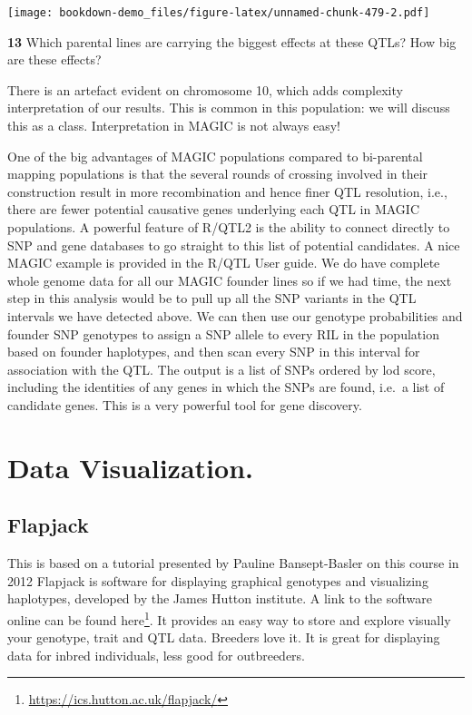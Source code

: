 \documentclass[
]{book}
\makeatletter
\renewcommand{\href}[2]{#2\footnote{\url{#1}}}
\newenvironment{kframe}{%
\medskip{}
\setlength{\fboxsep}{.8em}
 \def\at@end@of@kframe{}%
 \ifinner\ifhmode%
  \def\at@end@of@kframe{\end{minipage}}%
  \begin{minipage}{\columnwidth}%
 \fi\fi%
 \def\FrameCommand##1{\hskip\@totalleftmargin \hskip-\fboxsep
 \colorbox{shadecolor}{##1}\hskip-\fboxsep
     \hskip-\linewidth \hskip-\@totalleftmargin \hskip\columnwidth}%
 \MakeFramed {\advance\hsize-\width
   \@totalleftmargin\z@ \linewidth\hsize
   \@setminipage}}%
 {\par\unskip\endMakeFramed%
 \at@end@of@kframe}
\newenvironment{rmdblock}[1]
  {
  \begin{itemize}
  \renewcommand{\labelitemi}{
    \raisebox{-.7\height}[0pt][0pt]{
      {\setkeys{Gin}{width=3em,keepaspectratio}\texttt{[image: images/\#1]}}
    }
  }
  \setlength{\fboxsep}{1em}
  \begin{kframe}
  \item
  }
  {
  \end{kframe}
  \end{itemize}
  }
\newenvironment{rmdquiz}
  {\begin{rmdblock}{quiz}}
  {\end{rmdblock}}
\makeatother
\begin{document}
\texttt{[image: bookdown-demo\_files/figure-latex/unnamed-chunk-479-2.pdf]}

\begin{rmdquiz}
\textbf{13}
Which parental lines are carrying the biggest effects at these QTLs? How big are these effects?
\end{rmdquiz}

There is an artefact evident on chromosome 10, which adds complexity interpretation of our results. This is common in this population: we will discuss this as a class. Interpretation in MAGIC is not always easy!

One of the big advantages of MAGIC populations compared to bi-parental mapping populations is that the several rounds of crossing involved in their construction result in more recombination and hence finer QTL resolution, i.e., there are fewer potential causative genes underlying each QTL in MAGIC populations. A powerful feature of R/QTL2 is the ability to connect directly to SNP and gene databases to go straight to this list of potential candidates. A nice MAGIC example is provided in the R/QTL User guide. We do have complete whole genome data for all our MAGIC founder lines so if we had time, the next step in this analysis would be to pull up all the SNP variants in the QTL intervals we have detected above. We can then use our genotype probabilities and founder SNP genotypes to assign a SNP allele to every RIL in the population based on founder haplotypes, and then scan every SNP in this interval for association with the QTL. The output is a list of SNPs ordered by lod score, including the identities of any genes in which the SNPs are found, i.e.~a list of candidate genes. This is a very powerful tool for gene discovery.

\hypertarget{Data_Visualization}{%
\chapter{Data Visualization.}\label{Data_Visualization}}

\hypertarget{flapjack}{%
\section{Flapjack}\label{flapjack}}

This is based on a tutorial presented by Pauline Bansept-Basler on this course in 2012
Flapjack is software for displaying graphical genotypes and visualizing haplotypes, developed
by the James Hutton institute. A link to the software online can be found \href{https://ics.hutton.ac.uk/flapjack/}{here}. It provides an easy way to store and explore visually your genotype, trait and QTL data. Breeders love it. It is great for displaying data for inbred individuals, less good for outbreeders.
\end{document}
